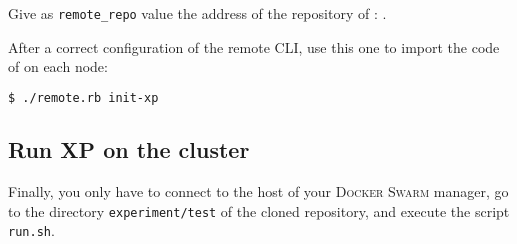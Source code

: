Give as \texttt{remote\_repo} value the address of the repository of \SS{}: \securestreamrepo{}.

After a correct configuration of the remote CLI, use this one to import the code of \SS{}  on each node:

\begin{lstlisting}[language=bash, basicstyle=\small]
$ ./remote.rb init-xp
\end{lstlisting}


\subsection{Run XP on the cluster}
\label{subsec:pocusage:run-xp}

Finally, you only have to connect to the host of your \textsc{Docker Swarm} manager, go to the directory \texttt{experiment/test} of the cloned repository, and execute the script \texttt{run.sh}.
